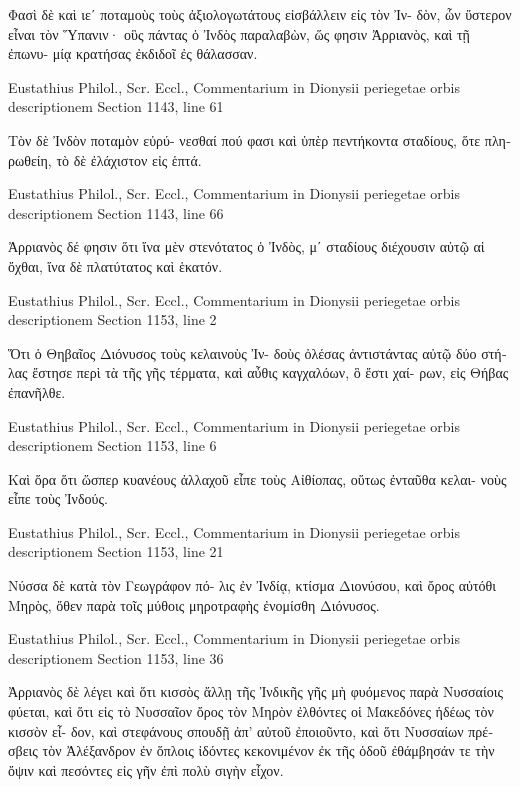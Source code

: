 \documentclass[12pt,letterpaper,twoside,final]{memoir}
\begin{document}
\begin{greek}
                                        Φασὶ δὲ καὶ ιεʹ 
ποταμοὺς τοὺς ἀξιολογωτάτους εἰσβάλλειν εἰς τὸν Ἰν-
δὸν, ὧν ὕστερον εἶναι τὸν Ὕπανιν· οὓς πάντας ὁ 
Ἰνδὸς παραλαβὼν, ὥς φησιν Ἀρριανὸς, καὶ τῇ ἐπωνυ-
μίᾳ κρατήσας ἐκδιδοῖ ἐς θάλασσαν. 



Eustathius Philol., Scr. Eccl., Commentarium in Dionysii periegetae orbis descriptionem 
Section 1143, line 61

                          Τὸν δὲ Ἰνδὸν ποταμὸν εὐρύ-
νεσθαί πού φασι καὶ ὑπὲρ πεντήκοντα σταδίους, ὅτε 
πληρωθείη, τὸ δὲ ἐλάχιστον εἰς ἑπτά. 



Eustathius Philol., Scr. Eccl., Commentarium in Dionysii periegetae orbis descriptionem 
Section 1143, line 66

        Ἀρριανὸς δέ φησιν ὅτι ἵνα μὲν στενότατος ὁ 
Ἰνδὸς, μʹ σταδίους διέχουσιν αὐτῷ αἱ ὄχθαι, ἵνα δὲ 
πλατύτατος καὶ ἑκατόν. 



Eustathius Philol., Scr. Eccl., Commentarium in Dionysii periegetae orbis descriptionem 
Section 1153, line 2

Ὅτι ὁ Θηβαῖος Διόνυσος τοὺς κελαινοὺς Ἰν-
δοὺς ὀλέσας ἀντιστάντας αὐτῷ δύο στήλας ἔστησε περὶ 
τὰ τῆς γῆς τέρματα, καὶ αὖθις καγχαλόων, ὃ ἔστι χαί-
ρων, εἰς Θήβας ἐπανῆλθε. 



Eustathius Philol., Scr. Eccl., Commentarium in Dionysii periegetae orbis descriptionem 
Section 1153, line 6

                              Καὶ ὅρα ὅτι ὥσπερ κυανέους 
ἀλλαχοῦ εἶπε τοὺς Αἰθίοπας, οὕτως ἐνταῦθα κελαι-
νοὺς εἶπε τοὺς Ἰνδούς. 



Eustathius Philol., Scr. Eccl., Commentarium in Dionysii periegetae orbis descriptionem 
Section 1153, line 21

                  Νύσσα δὲ κατὰ τὸν Γεωγράφον πό-
λις ἐν Ἰνδίᾳ, κτίσμα Διονύσου, καὶ ὄρος αὐτόθι Μηρὸς, 
ὅθεν παρὰ τοῖς μύθοις μηροτραφὴς ἐνομίσθη Διόνυσος. 



Eustathius Philol., Scr. Eccl., Commentarium in Dionysii periegetae orbis descriptionem 
Section 1153, line 36

                               Ἀρριανὸς δὲ λέγει καὶ ὅτι 
κισσὸς ἄλλῃ τῆς Ἰνδικῆς γῆς μὴ φυόμενος παρὰ 
Νυσσαίοις φύεται, καὶ ὅτι εἰς τὸ Νυσσαῖον ὄρος 
τὸν Μηρὸν ἐλθόντες οἱ Μακεδόνες ἡδέως τὸν κισσὸν εἶ-
δον, καὶ στεφάνους σπουδῇ ἀπ' αὐτοῦ ἐποιοῦντο, 
καὶ ὅτι Νυσσαίων πρέσβεις τὸν Ἀλέξανδρον ἐν ὅπλοις 
ἰδόντες κεκονιμένον ἐκ τῆς ὁδοῦ ἐθάμβησάν τε τὴν 
ὄψιν καὶ πεσόντες εἰς γῆν ἐπὶ πολὺ σιγὴν εἶχον. 




\end{greek}
\end{document}
